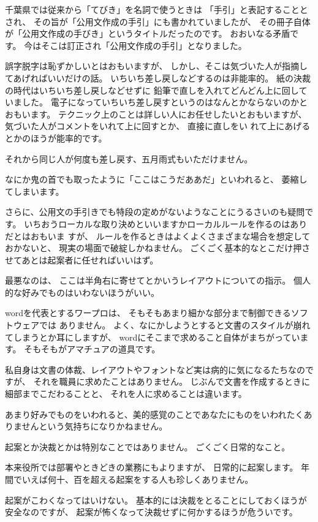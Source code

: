 \documentclass[uplatex,jis2004,dvipdfmx,12pt]{jsarticle}
\begin{document}
千葉県では従来から「てびき」を名詞で使うときは
「手引」と表記することとされ、
その旨が「公用文作成の手引」にも書かれていましたが、
その冊子自体が「公用文作成の手びき」というタイトルだったのです。
おおいなる矛盾です。
今はそこは訂正され「公用文作成の手引」となりました。




誤字脱字は恥ずかしいとはおもいますが、
しかし、そこは気づいた人が指摘してあげればいいだけの話。
いちいち差し戻しなどするのは非能率的。
紙の決裁の時代はいちいち差し戻しなどせずに
鉛筆で直しを入れてどんどん上に回していました。
電子になっていちいち差し戻すというのはなんとかならないのかとおもいます。
テクニック上のことは詳しい人にお任せしたいとおもいますが、
気づいた人がコメントをいれて上に回すとか、
直接に直しをい
れて上にあげるとかのほうが能率的です。

それから同じ人が何度も差し戻す、五月雨式もいただけません。

なにか鬼の首でも取ったように「ここはこうだああだ」といわれると、
萎縮してしまいます。

さらに、公用文の手引きでも特段の定めがないようなことにうるさいのも疑問で
す。
いちおうローカルな取り決めといいますかローカルルールを作るのはありだとはおもいま
すが、
ルールを作るときはよくよくさまざまな場合を想定しておかないと、
現実の場面で破綻しかねません。
ごくごく基本的なとこだけ押させてあとは起案者に任せればいいはず。

最悪なのは、
ここは半角右に寄せてとかいうレイアウトについての指示。
個人的な好みでものはいわないほうがいい。


wordを代表とするワープロは、
そもそもあまり細かな部分まで制御できるソフトウェアでは
ありません。
よく、なにかしようとすると文書のスタイルが崩れてしまうとか耳にしますが、
wordにそこまで求めること自体がまちがっています。
そもそもがアマチュアの道具です。


私自身は文書の体裁、レイアウトやフォントなど実は病的に気になるたちなのですが、
それを職員に求めたことはありません。
じぶんで文書を作成するときに細部までこだわることと、
それを人に求めることは違います。

あまり好みでものをいわれると、美的感覚のことであなたにものをいわれたくあ
りませんという気持ちになりかねません。


起案とか決裁とかは特別なことではありません。
ごくごく日常的なこと。

本来役所では部署やときどきの業務にもよりますが、
日常的に起案します。
年間でいえば何十、百を超える起案をする人も珍しくありません。

起案がこわくなってはいけない。
基本的には決裁をとることにしておくほうが安全なのですが、
起案が怖くなって決裁せずに何かするほうが危ういです。
\end{document}
